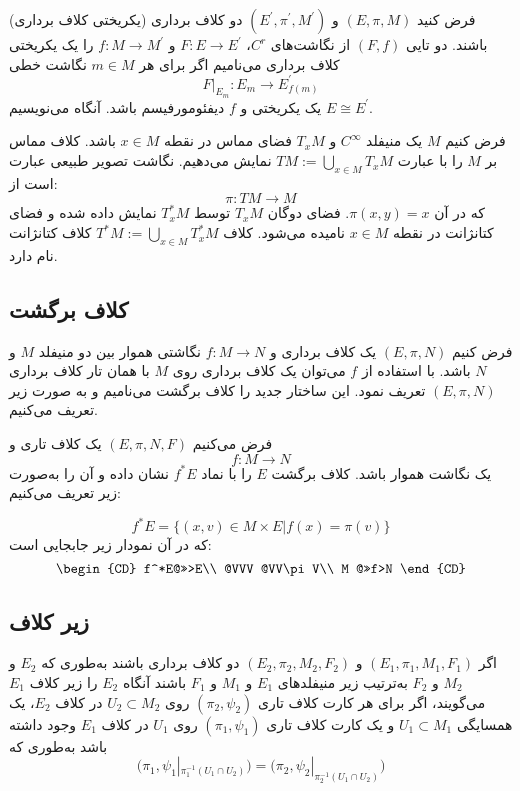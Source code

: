 \begin{definition}(یکریختی  کلاف  برداری)
فرض کنید 
$ (E,\pi, M) $ و $ ( E^ \prime , \pi ^ \prime , M^ \prime) $
دو کلاف  برداری  باشند.  دو تایی  $ (F ,f ) $ از نگاشت‌های  $ C ^r $، 
$ F :E \longrightarrow E^ \prime $ و  $ f : M \longrightarrow M^ \prime $
 را  یک  یکریختی  کلاف  برداری  می‌نامیم اگر  برای  هر $ m \in M $ نگاشت  خطی 
 $$ F |_{E_m}: E_m \longrightarrow E _{f(m)}^ \prime $$
 یک  یکریختی  و  $ f $  دیفئومورفیسم  باشد. آنگاه  می‌نویسیم
 $ E \cong E^ \prime  $. 
\end{definition}
\begin {definition}
فرض کنیم $ M $ یک منیفلد $ C^{\infty} $  و $ T_{x}M $ فضای مماس در نقطه $ x\in M $  باشد. کلاف مماس بر $ M $ را با عبارت $ TM:=\bigcup_{x\in M} T_{x}M $  نمایش می‌دهیم. نگاشت تصویر طبیعی عبارت است از:
\begin{equation*}
\pi:TM \rightarrow M
\end{equation*}
که در آن $ \pi(x,y)=x $. فضای دوگان $ T_{x}M $ توسط $ T^*_{x}M $ نمایش داده شده و فضای کتانژانت در نقطه $ x \in M $ نامیده می‌شود. کلاف $ T^*M:=\bigcup_{ x\in M}T^*_{x}M $ کلاف کتانژانت نام دارد.\\
\end{definition}

\subsection{کلاف برگشت }
فرض  کنیم 
$ (E,\pi,N ) $
یک  کلاف  برداری و 
$ f: M \longrightarrow N $
نگاشتی  هموار  بین دو منیفلد
$ M $ 
و 
$ N $
باشد. با استفاده از 
$ f $
 می‌توان یک  کلاف  برداری روی 
$ M $
با همان تار کلاف  برداری 
$ (E,\pi, N) $
تعریف نمود. این  ساختار جدید را کلاف برگشت  می‌نامیم و به صورت زیر تعریف  می‌کنیم.
\begin{definition}
فرض  می‌کنیم $ (E,\pi,N,F) $ یک کلاف تاری و $$ f:M \rightarrow N $$  یک نگاشت هموار باشد. کلاف برگشت $E $ را با نماد $ f^*E $ نشان داده و آن را به‌صورت زیر تعریف  می‌کنیم:

$$ f^*E=\{(x,v) \in M \times E \rvert f(x)=\pi (v)\} $$
که در آن نمودار زیر جابجایی است:
	$$\begin{CD}
	f^*E@>>>E\\
	@VVV @VV\pi V\\
	M @>>f>N
	\end{CD}$$
\end{definition}

\subsection{زیر کلاف}
اگر 
$ (E_1, \pi_1, M_1, F_1) $
 و 
 $ (E_2, \pi_2, M_2, F_2) $
 دو  کلاف  برداری  باشند  به‌طوری   که  $ E_2$ و $ M_2 $ و  $ F_2 $
  به‌ترتیب  زیر منیفلدهای  $ E_1 $ و  $ M_1 $ و  $ F_1 $  باشند آنگاه  $ E_2 $ را  زیر  کلاف 
   $ E _1 $
    می‌گویند،  اگر  برای  هر  کارت  کلاف  تاری   $ ( \pi_2, \psi_ 2) $
   روی  $ U_2 \subset M_2 $  در کلاف 
  $ E_2 $، 
   یک  همسایگی  $ U _1 \subset M_1 $ و  یک  کارت  کلاف  تاری   $ (\pi_1, \psi _1) $ 
   روی  $ U _1 $  در  کلاف  
  $  E _ 1 $
     وجود  داشته  باشد  به‌طوری  که  
  $$ \Big( \pi_1, \psi _1|_{\pi _1^{-1}(U_1 \cap U_2)} \Big) = \Big( \pi_2, \psi _2|_{\pi _2^{-1}(U_1 \cap U_2)} \Big) $$
